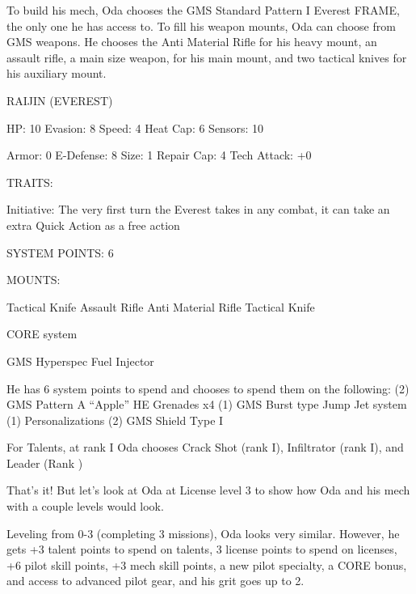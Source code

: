 To build his mech, Oda chooses the GMS Standard Pattern I Everest FRAME, the only one he  
has access to. To fill his weapon mounts, Oda can choose from GMS weapons. He chooses the  
Anti Material Rifle for his heavy mount, an assault rifle, a main size weapon, for his main mount,  
and two tactical knives for his auxiliary mount.
 

                                                                                                              


                                             RAIJIN (EVEREST) 

  HP: 10          Evasion: 8                             Speed: 4            Heat Cap: 6        Sensors: 10 

  Armor: 0        E-Defense: 8                           Size: 1             Repair Cap: 4      Tech Attack:  
                                                                                                +0 

                                                     TRAITS: 

  Initiative: The very first turn the Everest takes in any combat, it can take an extra Quick Action as a free  
  action 

                                               SYSTEM POINTS: 6 

                                                    MOUNTS: 

  Tactical Knife
                    Assault Rifle                           Anti Material Rifle 
  Tactical Knife 

                                                  CORE system 

                                         GMS Hyperspec Fuel Injector 

He has 6 system points to spend and chooses to spend them on the following:  
(2) GMS Pattern A “Apple” HE Grenades x4  
(1) GMS Burst type Jump Jet system  
(1) Personalizations  
(2) GMS Shield Type I
 

For Talents, at rank I Oda chooses Crack Shot (rank I), Infiltrator (rank I), and Leader (Rank ) 
 
That’s it! But let’s look at Oda at License level 3 to show how Oda and his mech with a couple  
levels would look.
 

Leveling from 0-3 (completing 3 missions), Oda looks very similar. However, he gets +3 talent  
points to spend on talents, 3 license points to spend on licenses, +6 pilot skill points, +3 mech  
skill points, a new pilot specialty, a CORE bonus, and access to advanced pilot gear, and his grit  
goes up to 2.
 

